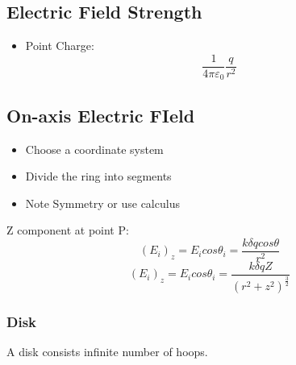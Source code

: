 \documentclass[12pt]{article}
\begin{document}
\subsection{Electric Field Strength}
\begin{itemize}
\item Point Charge:
\begin{displaymath}
\frac{1}{4\pi\varepsilon_0}\frac{q}{r^2}
\end{displaymath}
\end{itemize}
\subsection{On-axis Electric FIeld}
\begin{itemize}
\item Choose a coordinate system
\item Divide the ring into segments
\item Note Symmetry or use calculus
\end{itemize}
Z component at point P:
\begin{displaymath}
(E_i)_z = E_i cos \theta_i = \frac {k \delta q cos \theta}{r^2}
\end{displaymath}
\begin{displaymath}
(E_i)_z = E_i cos \theta_i = \frac {k \delta q Z }{(r^2+z^2)^{\frac{3}{2}}}
\end{displaymath}

\subsubsection{Disk}
A disk consists infinite number of hoops.
\end{document}
